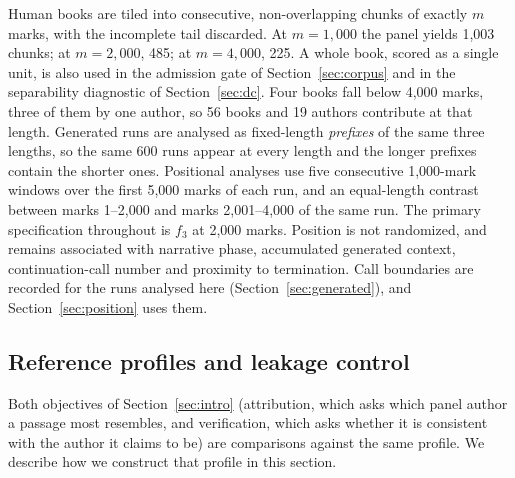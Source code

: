 \documentclass[11pt]{article}
\newcommand{\fThree}{\ensuremath{f_3}\xspace}
\begin{document}
Human books are tiled into consecutive, non-overlapping chunks of exactly
\(m\) marks, with the incomplete tail discarded.  At \(m = 1{,}000\) the
panel yields 1,003 chunks; at \(m = 2{,}000\), 485; at \(m = 4{,}000\),
225.  A whole book, scored as a single unit, is also used in
the admission gate of Section~\ref{sec:corpus} and in the separability
diagnostic of Section~\ref{sec:dc}.  Four books fall below 4,000 marks,
three of them by one author, so 56 books and 19 authors contribute at that
length.  Generated runs are analysed as
fixed-length \emph{prefixes} of the same three lengths, so the same 600
runs appear at every length and the longer prefixes contain the shorter
ones.  Positional analyses use five consecutive 1,000-mark windows over the
first 5,000 marks of each run, and an equal-length contrast between marks
1--2,000 and marks 2,001--4,000 of the same run.  The primary specification
throughout is \fThree at 2,000 marks.  Position is not randomized, and
remains associated with narrative phase, accumulated generated context,
continuation-call number and proximity to termination.  Call boundaries
are recorded for the runs analysed here (Section~\ref{sec:generated}),
and Section~\ref{sec:position} uses them.


\subsection{Reference profiles and leakage control}
\label{sec:references}

Both objectives of Section~\ref{sec:intro} (attribution, which asks which
panel author a passage most resembles, and verification, which asks whether
it is consistent with the author it claims to be) are comparisons against
the same profile.  We describe how we construct that profile in this section.
\end{document}
